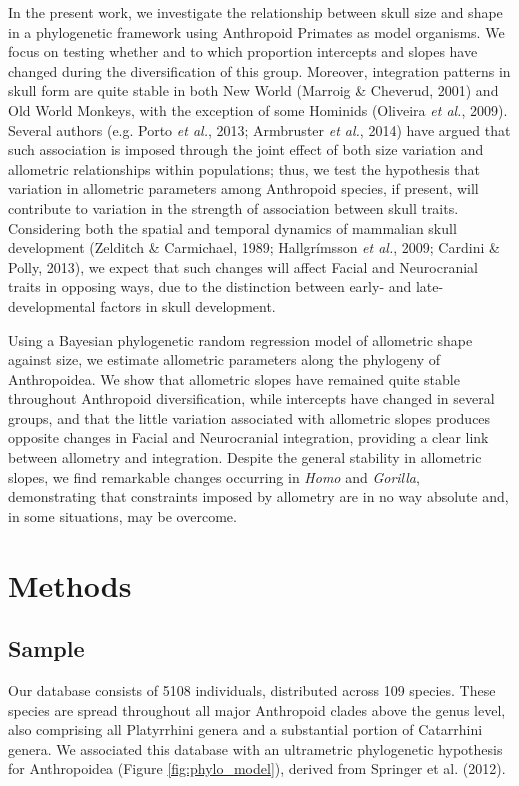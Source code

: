 \documentclass[12pt,twoside]{report}
\begin{document}
In the present work, we investigate the relationship between skull size
and shape in a phylogenetic framework using Anthropoid Primates as model
organisms. We focus on testing whether and to which proportion
intercepts and slopes have changed during the diversification of this
group. Moreover, integration patterns in skull form are quite stable in
both New World (Marroig \& Cheverud, 2001) and Old World Monkeys, with
the exception of some Hominids (Oliveira \emph{et al.}, 2009). Several
authors (e.g. Porto \emph{et al.}, 2013; Armbruster \emph{et al.}, 2014)
have argued that such association is imposed through the joint effect of
both size variation and allometric relationships within populations;
thus, we test the hypothesis that variation in allometric parameters
among Anthropoid species, if present, will contribute to variation in
the strength of association between skull traits. Considering both the
spatial and temporal dynamics of mammalian skull development (Zelditch
\& Carmichael, 1989; Hallgrímsson \emph{et al.}, 2009; Cardini \& Polly,
2013), we expect that such changes will affect Facial and Neurocranial
traits in opposing ways, due to the distinction between early- and
late-developmental factors in skull development.

Using a Bayesian phylogenetic random regression model of allometric
shape against size, we estimate allometric parameters along the
phylogeny of Anthropoidea. We show that allometric slopes have remained
quite stable throughout Anthropoid diversification, while intercepts
have changed in several groups, and that the little variation associated
with allometric slopes produces opposite changes in Facial and
Neurocranial integration, providing a clear link between allometry and
integration. Despite the general stability in allometric slopes, we find
remarkable changes occurring in \emph{Homo} and \emph{Gorilla},
demonstrating that constraints imposed by allometry are in no way
absolute and, in some situations, may be overcome.

\section{Methods}\label{methods-1}

\subsection{Sample}\label{sample-1}

Our database consists of 5108 individuals, distributed across 109
species. These species are spread throughout all major Anthropoid clades
above the genus level, also comprising all Platyrrhini genera and a
substantial portion of Catarrhini genera. We associated this database
with an ultrametric phylogenetic hypothesis for Anthropoidea (Figure
\ref{fig:phylo_model}), derived from Springer et al. (2012).
\end{document}
